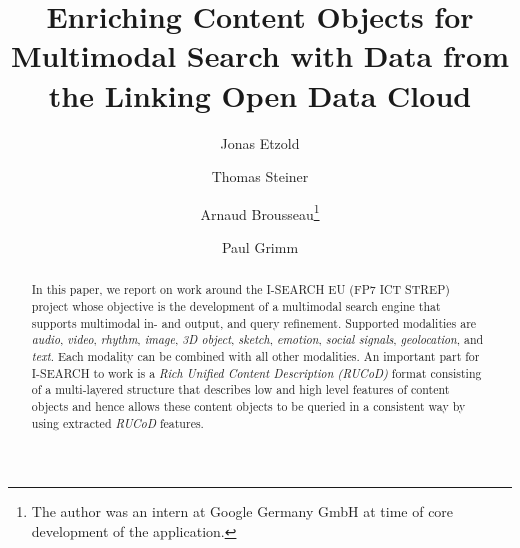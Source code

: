 \documentclass[runningheads,a4paper]{llncs}
\begin{document}
\mainmatter

\title{Enriching Content Objects for Multimodal Search with Data from the Linking Open Data Cloud}

\author{Jonas Etzold \and Thomas Steiner \and Arnaud Brousseau\thanks{The author was an intern at Google Germany GmbH at time of core development of the application.} \and Paul Grimm}


\maketitle

\begin{abstract}
In this paper, we report on work around the \mbox{I-SEARCH} EU (FP7 ICT STREP) project whose objective is the development of a multimodal search engine that supports multimodal in- and output, and query refinement.
Supported modalities are \emph{audio}, \emph{video}, \emph{rhythm}, \emph{image}, \emph{3D object}, \emph{sketch}, \emph{emotion}, \emph{social signals}, \emph{geolocation}, and \emph{text}.
Each modality can be combined with all other modalities.
An important part for \mbox{I-SEARCH} to work is a \emph{Rich Unified Content Description \mbox{(RUCoD)}} format consisting of a multi-layered structure that describes low and high level features of content objects and hence allows these content objects to be queried in a consistent way by using extracted \mbox{\emph{RUCoD}} features.
\end{abstract}



\end{document}
